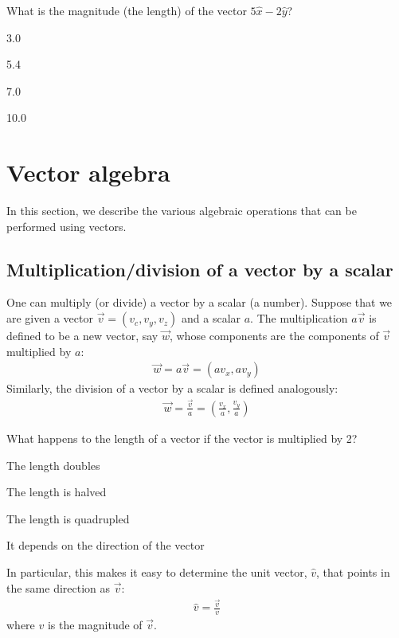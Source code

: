 \begin{checkpointMC}{What is the magnitude (the length) of the vector $5\hat x-2\hat y$?}
\item 3.0
\item 5.4%
\item 7.0
\item 10.0
\end{checkpointMC}

\section{Vector algebra}
In this section, we describe the various algebraic operations that can be performed using vectors. 
\subsection{Multiplication/division of a vector by a scalar}
One can multiply (or divide) a vector by a scalar (a number). Suppose that we are given a vector $\vec v=(v_c, v_y, v_z)$ and a scalar $a$. The multiplication $a\vec v$ is defined to be a new vector, say $\vec w$, whose components are the components of $\vec v$ multiplied by $a$:
\begin{align*}
\vec w = a\vec v = (av_x, a v_y)
\end{align*}
Similarly, the division of a vector by a scalar is defined analogously:
\begin{align*}
\vec w = \frac{\vec v}{a} = \left(\frac{v_x}{a}, \frac{v_y}{a}\right)
\end{align*}
\begin{checkpointMC}{What happens to the length of a vector if the vector is multiplied by 2?}
\item The length doubles%
\item The length is halved
\item The length is quadrupled
\item It depends on the direction of the vector
\end{checkpointMC}

In particular, this makes it easy to determine the unit vector, $\hat v$, that points in the same direction as $\vec v$:
\begin{align*}
\hat v = \frac{\vec v}{v}
\end{align*}
where $v$ is the magnitude of $\vec v$. 

